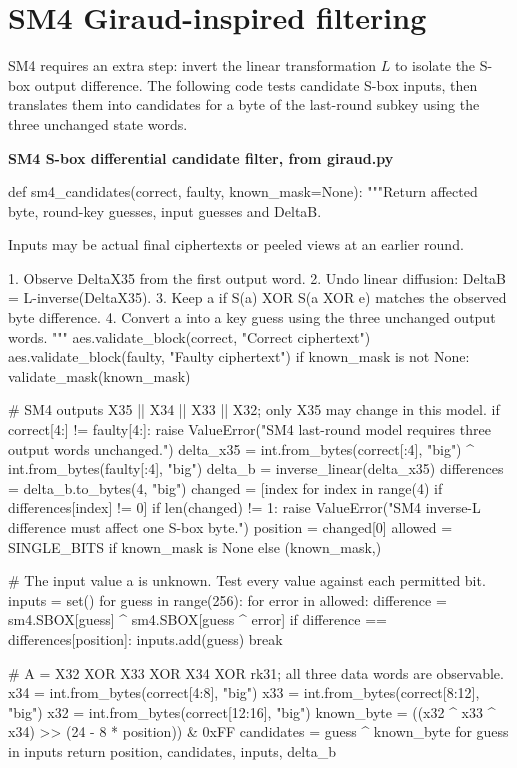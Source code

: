 \section{SM4 Giraud-inspired filtering}
SM4 requires an extra step: invert the linear transformation $L$ to isolate the S-box output difference. The following code tests candidate S-box inputs, then translates them into candidates for a byte of the last-round subkey using the three unchanged state words.
\par\smallskip\noindent\textbf{SM4 S-box differential candidate filter, from giraud.py}\par
\begin{lightcode}
def sm4_candidates(correct, faulty, known_mask=None):
    """Return affected byte, round-key guesses, input guesses and DeltaB.

    Inputs may be actual final ciphertexts or peeled views at an earlier round.

    1. Observe DeltaX35 from the first output word.
    2. Undo linear diffusion: DeltaB = L-inverse(DeltaX35).
    3. Keep a if S(a) XOR S(a XOR e) matches the observed byte difference.
    4. Convert a into a key guess using the three unchanged output words.
    """
    aes.validate_block(correct, "Correct ciphertext")
    aes.validate_block(faulty, "Faulty ciphertext")
    if known_mask is not None:
        validate_mask(known_mask)

    # SM4 outputs X35 || X34 || X33 || X32; only X35 may change in this model.
    if correct[4:] != faulty[4:]:
        raise ValueError("SM4 last-round model requires three output words unchanged.")
    delta_x35 = int.from_bytes(correct[:4], "big") ^ int.from_bytes(faulty[:4], "big")
    delta_b = inverse_linear(delta_x35)
    differences = delta_b.to_bytes(4, "big")
    changed = [index for index in range(4) if differences[index] != 0]
    if len(changed) != 1:
        raise ValueError("SM4 inverse-L difference must affect one S-box byte.")
    position = changed[0]
    allowed = SINGLE_BITS if known_mask is None else (known_mask,)

    # The input value a is unknown. Test every value against each permitted bit.
    inputs = set()
    for guess in range(256):
        for error in allowed:
            difference = sm4.SBOX[guess] ^ sm4.SBOX[guess ^ error]
            if difference == differences[position]:
                inputs.add(guess)
                break

    # A = X32 XOR X33 XOR X34 XOR rk31; all three data words are observable.
    x34 = int.from_bytes(correct[4:8], "big")
    x33 = int.from_bytes(correct[8:12], "big")
    x32 = int.from_bytes(correct[12:16], "big")
    known_byte = ((x32 ^ x33 ^ x34) >> (24 - 8 * position)) & 0xFF
    candidates = {guess ^ known_byte for guess in inputs}
    return position, candidates, inputs, delta_b
\end{lightcode}
